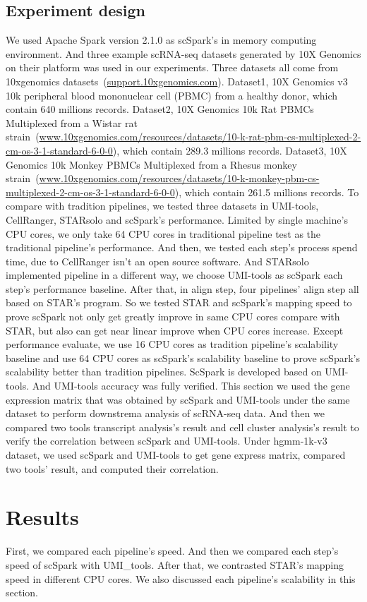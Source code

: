 \documentclass[conference]{IEEEtran}
\begin{document}
\subsection{Experiment design}
We used Apache Spark version 2.1.0 as scSpark's in memory computing environment.
And three example scRNA-seq datasets generated by 10X Genomics on their platform was used in our experiments.
Three datasets all come from 10xgenomics datasets~(\url{support.10xgenomics.com}).
Dataset1, 10X Genomics v3 10k peripheral blood mononuclear cell (PBMC) from a healthy donor, which contain 640 millions records.
Dataset2, 10X Genomics 10k Rat PBMCs Multiplexed from a  Wistar rat strain~(\url{www.10xgenomics.com/resources/datasets/10-k-rat-pbm-cs-multiplexed-2-cm-os-3-1-standard-6-0-0}), which contain 289.3 millions records.
Dataset3, 10X Genomics 10k Monkey PBMCs Multiplexed from a Rhesus monkey strain~(\url{www.10xgenomics.com/resources/datasets/10-k-monkey-pbm-cs-multiplexed-2-cm-os-3-1-standard-6-0-0}), which contain 261.5 millions records.
To compare with tradition pipelines, we tested three datasets in UMI-tools, CellRanger, STARsolo and scSpark's performance.
Limited by single machine's CPU cores, we only take 64 CPU cores in traditional pipeline test as the traditional pipeline's performance.
And then, we tested each step's process spend time, due to CellRanger isn't an open source software.
And STARsolo implemented pipeline in a different way, we choose UMI-tools as scSpark each step's performance baseline.
After that, in align step, four pipelines' align step all based on STAR's program.
So we tested STAR and scSpark's mapping speed to prove scSpark not only get greatly improve in same CPU cores compare with STAR, but also can get near linear improve when CPU cores increase.
Except performance evaluate, we use 16 CPU cores as tradition pipeline's scalability baseline and use 64 CPU cores as scSpark's scalability baseline to prove scSpark's scalability better than tradition pipelines.
ScSpark is developed based on UMI-tools. 
And UMI-tools accuracy was fully verified. 
This section we used the gene expression matrix that was obtained by scSpark and UMI-tools under the same dataset to perform downstrema analysis of scRNA-seq data. 
And then we compared two tools transcript analysis's result and cell cluster analysis's result to verify the correlation between scSpark and UMI-tools. 
Under hgmm-1k-v3 dataset, we used scSpark and UMI-tools to get gene express matrix, compared two tools' result, and computed their correlation.

\section{Results}
First, we compared each pipeline's speed.
And then we compared each step's speed of scSpark with UMI\_tools.
After that, we contrasted STAR's mapping speed in different CPU cores.
We also discussed each pipeline's scalability in this section.
\end{document}
